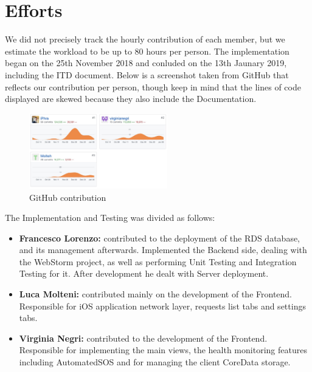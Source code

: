 \documentclass[titlepage]{article}
\begin{document}
	\pagebreak
	\section{Efforts}
	We did not precisely track the hourly contribution of each member, but we estimate the workload to be up to 80 hours per person. \newline
	The implementation began on the 25th November 2018 and conluded on the 13th Jaunary 2019, including the ITD document. Below is a screenshot taken from GitHub that reflects our contribution per person, though keep in mind that the lines of code displayed are skewed because they also include the Documentation. 
	
	\begin{figure}[H]
		\center
		\includegraphics[width=6cm]{GitHub.png}
		\caption{GitHub contribution}
		\label{fig:Hist}
	\end{figure}
	
	The Implementation and Testing was divided as follows:
	\begin{itemize}
		\item {\bf Francesco Lorenzo:}
		contributed to the deployment of the RDS database, and its management afterwards.
		Implemented the Backend side, dealing with the WebStorm project, as well as performing Unit Testing and Integration Testing for it. After development he dealt with Server deployment.
		
		\item {\bf Luca Molteni:}
		contributed mainly on the development of the Frontend. Responsible for iOS application network layer, requests list tabs and settings tabs.
		
		\item {\bf Virginia Negri:} 
		contributed to the development of the Frontend. Responsible for implementing the main views, the health monitoring features including AutomatedSOS and for managing the client CoreData storage.
	\end{itemize}
	
	
\end{document}

